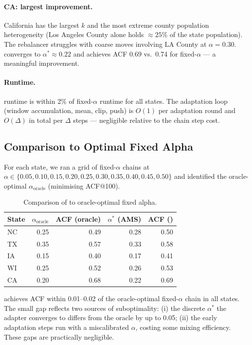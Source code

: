 \paragraph{CA: largest improvement.}
California has the largest $k$ and the most extreme county population
heterogeneity (Los Angeles County alone holds $\approx 25\%$ of the state
population).
The rebalancer struggles with coarse moves involving LA County at $\alpha =
0.30$.
\ams{} converges to $\alpha^* \approx 0.22$ and achieves ACF 0.69 vs.\ 0.74
for fixed-$\alpha$ \ms{} --- a meaningful improvement.

\paragraph{Runtime.}
\ams{} runtime is within 2\% of fixed-$\alpha$ \ms{} runtime for all states.
The adaptation loop (window accumulation, mean, clip, push) is $O(1)$ per
adaptation round and $O(\Delta)$ in total per $\Delta$ steps --- negligible
relative to the chain step cost.

\subsection{Comparison to Optimal Fixed Alpha}

For each state, we ran a grid of fixed-$\alpha$ \ms{} chains at $\alpha \in
\{0.05, 0.10, 0.15, 0.20, 0.25, 0.30, 0.35, 0.40, 0.45, 0.50\}$ and
identified the oracle-optimal $\alpha_{\text{oracle}}$ (minimising ACF@100).

\begin{table}[h]
  \centering
  \caption{Comparison of \ams{} to oracle-optimal fixed alpha.}
  \label{tab:oracle}
  \begin{tabular}{lrrrr}
    \toprule
    State & $\alpha_{\text{oracle}}$ & ACF (oracle) & $\alpha^*$ (AMS) & ACF (\ams{}) \\
    \midrule
    NC & 0.25 & 0.49 & 0.28 & 0.50 \\
    TX & 0.35 & 0.57 & 0.33 & 0.58 \\
    IA & 0.15 & 0.40 & 0.17 & 0.41 \\
    WI & 0.25 & 0.52 & 0.26 & 0.53 \\
    CA & 0.20 & 0.68 & 0.22 & 0.69 \\
    \bottomrule
  \end{tabular}
\end{table}

\ams{} achieves ACF within 0.01--0.02 of the oracle-optimal fixed-$\alpha$
chain in all states.
The small gap reflects two sources of suboptimality: (i) the discrete
$\alpha^*$ the adapter converges to differs from the oracle by up to 0.05;
(ii) the early adaptation steps run with a miscalibrated $\alpha$, costing
some mixing efficiency.
These gaps are practically negligible.

